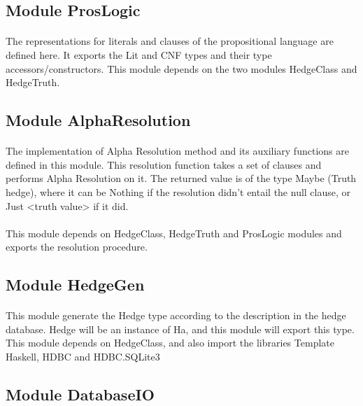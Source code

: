 \documentclass[26pt,fleqn,]{article}
\begin{document}
\subsection{Module ProsLogic}

\paragraph{}The representations for literals and clauses of the propositional language are defined here. It exports the Lit and CNF types and their type accessors/constructors. This module depends on the two modules HedgeClass and HedgeTruth.


\subsection{Module AlphaResolution}

\paragraph{}The implementation of Alpha Resolution method and its auxiliary functions are defined in this module. This resolution function takes a set of clauses and performs Alpha Resolution on it. The returned value is of the type Maybe (Truth hedge), where it can be Nothing if the resolution didn't entail the null clause, or Just <truth value> if it did.\\

\paragraph{}This module depends on HedgeClass, HedgeTruth and ProsLogic modules and exports the resolution procedure.

\subsection{Module HedgeGen}

\paragraph{}This module generate the Hedge type according to the description in the hedge database. Hedge will be an instance of Ha, and this module will export this type. This module depends on HedgeClass, and also import the libraries Template Haskell, HDBC and HDBC.SQLite3

\subsection{Module DatabaseIO}
\end{document}
